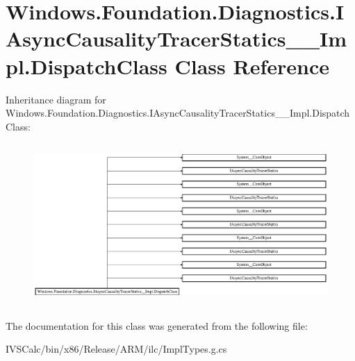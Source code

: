 \hypertarget{class_windows_1_1_foundation_1_1_diagnostics_1_1_i_async_causality_tracer_statics_____impl_1_1_dispatch_class}{}\section{Windows.\+Foundation.\+Diagnostics.\+I\+Async\+Causality\+Tracer\+Statics\+\_\+\+\_\+\+Impl.\+Dispatch\+Class Class Reference}
\label{class_windows_1_1_foundation_1_1_diagnostics_1_1_i_async_causality_tracer_statics_____impl_1_1_dispatch_class}
Inheritance diagram for Windows.\+Foundation.\+Diagnostics.\+I\+Async\+Causality\+Tracer\+Statics\+\_\+\+\_\+\+Impl.\+Dispatch\+Class\+:\begin{figure}[H]
\begin{center}
\leavevmode
\includegraphics[height=6.209677cm]{class_windows_1_1_foundation_1_1_diagnostics_1_1_i_async_causality_tracer_statics_____impl_1_1_dispatch_class}
\end{center}
\end{figure}


The documentation for this class was generated from the following file\+:\begin{DoxyCompactItemize}
\item 
I\+V\+S\+Calc/bin/x86/\+Release/\+A\+R\+M/ilc/Impl\+Types.\+g.\+cs\end{DoxyCompactItemize}
